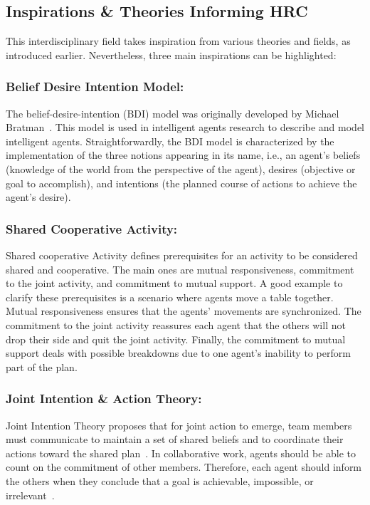 \subsection{Inspirations \& Theories Informing HRC}

This interdisciplinary field takes inspiration from various theories and fields, as introduced earlier. Nevertheless, three main inspirations can be highlighted:

\subsubsection*{Belief Desire Intention Model:} The belief-desire-intention (BDI) model was originally developed by Michael Bratman~\cite{Bratman1987_BRAIPA}. This model is used in intelligent agents research to describe and model intelligent agents. Straightforwardly, the BDI model is characterized by the implementation of the three notions appearing in its name, i.e., an agent's beliefs (knowledge of the world from the perspective of the agent), desires (objective or goal to accomplish), and intentions (the planned course of actions to achieve the agent's desire). 

\subsubsection*{Shared Cooperative Activity:} Shared cooperative Activity defines prerequisites for an activity to be considered shared and cooperative. The main ones are mutual responsiveness, commitment to the joint activity, and commitment to mutual support. A good example to clarify these prerequisites is a scenario where agents move a table together. Mutual responsiveness ensures that the agents' movements are synchronized. The commitment to the joint activity reassures each agent that the others will not drop their side and quit the joint activity. Finally, the commitment to mutual support deals with possible breakdowns due to one agent's inability to perform part of the plan.  

\subsubsection*{Joint Intention \& Action Theory:} 
Joint Intention Theory proposes that for joint action to emerge, team members must communicate to maintain a set of shared beliefs and to coordinate their actions toward the shared plan~\cite{cohen_teamwork_1991}. In collaborative work, agents should be able to count on the commitment of other members. Therefore, each agent should inform the others when they conclude that a goal is achievable, impossible, or irrelevant~\cite{hoffman2004collaboration}.

